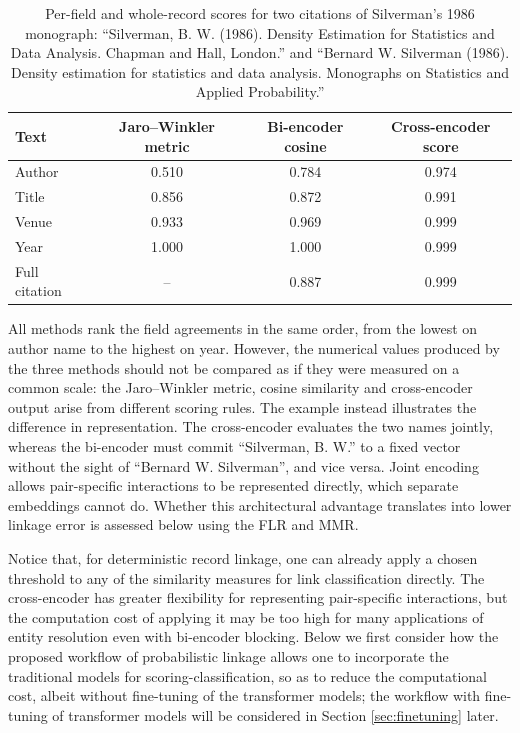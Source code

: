 \begin{table}[ht]
\centering
\caption{Per-field and whole-record scores for two citations of Silverman's 1986
monograph: ``Silverman, B. W. (1986). Density Estimation for Statistics and Data
Analysis. Chapman and Hall, London.'' and ``Bernard W. Silverman (1986). Density
estimation for statistics and data analysis. Monographs on Statistics and Applied
Probability.''}
\begin{tabular}{lccc}
\toprule
Text & Jaro--Winkler metric & Bi-encoder cosine & Cross-encoder score \\
\midrule
Author        & 0.510 & 0.784 & 0.974 \\
Title         & 0.856 & 0.872 & 0.991 \\
Venue         & 0.933 & 0.969 & 0.999 \\
Year          & 1.000 & 1.000 & 0.999 \\
Full citation & --    & 0.887 & 0.999 \\
\bottomrule
\end{tabular}
\label{tab:silverman-example}
\end{table}

All methods rank the field agreements in the same order, from the lowest on author
name to the highest on year. However, the numerical values produced by the three methods
should not be compared as if they were measured on a common scale: the Jaro--Winkler
metric, cosine similarity and cross-encoder output arise from different scoring rules. The
example instead illustrates the difference in representation. The cross-encoder evaluates
the two names jointly, whereas the bi-encoder must commit ``Silverman, B. W.'' to a fixed
vector without the sight of ``Bernard W. Silverman'', and vice versa. Joint encoding allows
pair-specific interactions to be represented directly, which separate embeddings cannot do.
Whether this architectural advantage translates into lower linkage error is assessed below
using the FLR and MMR.

Notice that, for deterministic record linkage, one can already apply a chosen threshold
to any of the similarity measures for link classification directly. The cross-encoder has greater flexibility for representing pair-specific
interactions, but the computation cost of applying it may be too high for many
applications of entity resolution even with bi-encoder blocking.
Below we first consider how the proposed workflow of probabilistic linkage allows one to
incorporate the traditional models for scoring-classification, so as to reduce the
computational cost, albeit without fine-tuning of the transformer models; the workflow
with fine-tuning of transformer models will be considered in Section
\ref{sec:finetuning} later.


